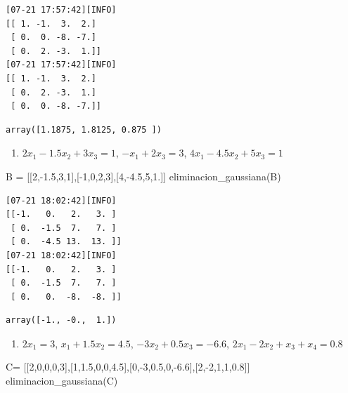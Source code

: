 \documentclass[
  letterpaper,
  DIV=11,
  numbers=noendperiod]{scrartcl}
\newenvironment{Shaded}{\begin{snugshade}}{\end{snugshade}}
\newcommand{\DecValTok}[1]{\textcolor[rgb]{0.68,0.00,0.00}{#1}}
\newcommand{\FloatTok}[1]{\textcolor[rgb]{0.68,0.00,0.00}{#1}}
\newcommand{\NormalTok}[1]{\textcolor[rgb]{0.00,0.23,0.31}{#1}}
\newcommand{\OperatorTok}[1]{\textcolor[rgb]{0.37,0.37,0.37}{#1}}
\providecommand{\tightlist}{%
  \setlength{\itemsep}{0pt}\setlength{\parskip}{0pt}}\usepackage{longtable,booktabs,array}
\begin{document}
\begin{verbatim}
[07-21 17:57:42][INFO] 
[[ 1. -1.  3.  2.]
 [ 0.  0. -8. -7.]
 [ 0.  2. -3.  1.]]
[07-21 17:57:42][INFO] 
[[ 1. -1.  3.  2.]
 [ 0.  2. -3.  1.]
 [ 0.  0. -8. -7.]]
\end{verbatim}

\begin{verbatim}
array([1.1875, 1.8125, 0.875 ])
\end{verbatim}

\begin{enumerate}
\def\labelenumi{\alph{enumi}.}
\setcounter{enumi}{1}
\tightlist
\item
  \(2x_1 -1.5 x_2 +3 x_3 = 1\), \(-x_1 +2x_3 = 3\),
  \(4x_1 -4.5 x_2+5x_3 = 1\)
\end{enumerate}

\begin{Shaded}
\begin{Highlighting}[]
\NormalTok{B }\OperatorTok{=}\NormalTok{ [[}\DecValTok{2}\NormalTok{,}\OperatorTok{{-}}\FloatTok{1.5}\NormalTok{,}\DecValTok{3}\NormalTok{,}\DecValTok{1}\NormalTok{],[}\OperatorTok{{-}}\DecValTok{1}\NormalTok{,}\DecValTok{0}\NormalTok{,}\DecValTok{2}\NormalTok{,}\DecValTok{3}\NormalTok{],[}\DecValTok{4}\NormalTok{,}\OperatorTok{{-}}\FloatTok{4.5}\NormalTok{,}\DecValTok{5}\NormalTok{,}\FloatTok{1.}\NormalTok{]]}
\NormalTok{eliminacion\_gaussiana(B)}
\end{Highlighting}
\end{Shaded}

\begin{verbatim}
[07-21 18:02:42][INFO] 
[[-1.   0.   2.   3. ]
 [ 0.  -1.5  7.   7. ]
 [ 0.  -4.5 13.  13. ]]
[07-21 18:02:42][INFO] 
[[-1.   0.   2.   3. ]
 [ 0.  -1.5  7.   7. ]
 [ 0.   0.  -8.  -8. ]]
\end{verbatim}

\begin{verbatim}
array([-1., -0.,  1.])
\end{verbatim}

\begin{enumerate}
\def\labelenumi{\alph{enumi}.}
\setcounter{enumi}{2}
\tightlist
\item
  \(2x_1 = 3\), \(x_1 +1.5x_2 = 4.5\), \(-3x_2 +0.5 x_3 = -6.6\),
  \(2x_1-2x_2+x_3+x_4=0.8\)
\end{enumerate}

\begin{Shaded}
\begin{Highlighting}[]
\NormalTok{C}\OperatorTok{=}\NormalTok{ [[}\DecValTok{2}\NormalTok{,}\DecValTok{0}\NormalTok{,}\DecValTok{0}\NormalTok{,}\DecValTok{0}\NormalTok{,}\DecValTok{3}\NormalTok{],[}\DecValTok{1}\NormalTok{,}\FloatTok{1.5}\NormalTok{,}\DecValTok{0}\NormalTok{,}\DecValTok{0}\NormalTok{,}\FloatTok{4.5}\NormalTok{],[}\DecValTok{0}\NormalTok{,}\OperatorTok{{-}}\DecValTok{3}\NormalTok{,}\FloatTok{0.5}\NormalTok{,}\DecValTok{0}\NormalTok{,}\OperatorTok{{-}}\FloatTok{6.6}\NormalTok{],[}\DecValTok{2}\NormalTok{,}\OperatorTok{{-}}\DecValTok{2}\NormalTok{,}\DecValTok{1}\NormalTok{,}\DecValTok{1}\NormalTok{,}\FloatTok{0.8}\NormalTok{]]}
\NormalTok{eliminacion\_gaussiana(C)}
\end{Highlighting}
\end{Shaded}
\end{document}
